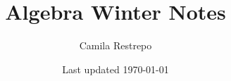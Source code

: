 \documentclass{notes}
\title{\bfseries Algebra Winter Notes}
\author{Camila Restrepo}
\date{Last updated \today}
\begin{document}
\maketitle
\toccontents
\frontpagewarning




\end{document}
